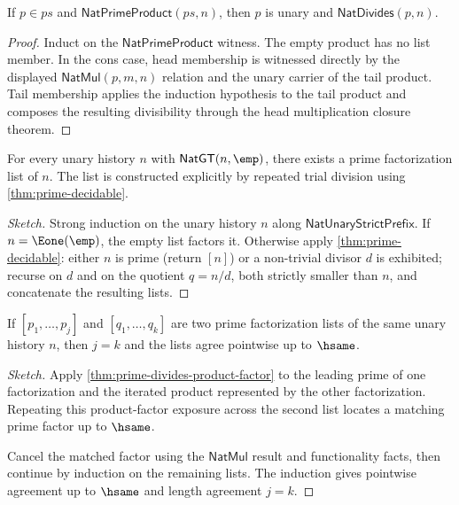 \begin{theorem}
\label{thm:nat-prime-product-factor-mem-unary-divides-result}
If \(p\in ps\) and \(\mathsf{NatPrimeProduct}(ps,n)\), then \(p\) is unary
and \(\mathsf{NatDivides}(p,n)\).
\end{theorem}
\begin{proof}
Induct on the \(\mathsf{NatPrimeProduct}\) witness. The empty product has no
list member. In the cons case, head membership is witnessed directly by the
displayed \(\mathsf{NatMul}(p,m,n)\) relation and the unary carrier of the
tail product. Tail membership applies the induction hypothesis to the tail
product and composes the resulting divisibility through the head
multiplication closure theorem.
\end{proof}

\begin{theorem}
\label{thm:ftoa-existence}
For every unary history \(n\) with \(\mathsf{NatGT}(n, \emp)\), there exists a prime factorization list of \(n\). The list is constructed explicitly by repeated trial division using \autoref{thm:prime-decidable}.
\end{theorem}
\begin{proof}[Sketch]
Strong induction on the unary history \(n\) along \(\mathsf{NatUnaryStrictPrefix}\). If \(n = \Eone(\emp)\), the empty list factors it. Otherwise apply \autoref{thm:prime-decidable}: either \(n\) is prime (return \([n]\)) or a non-trivial divisor \(d\) is exhibited; recurse on \(d\) and on the quotient \(q = n / d\), both strictly smaller than \(n\), and concatenate the resulting lists.
\end{proof}

\begin{theorem}
\label{thm:ftoa-uniqueness}
If \([p_1, \dots, p_j]\) and \([q_1, \dots, q_k]\) are two prime factorization lists of the same unary history \(n\), then \(j = k\) and the lists agree pointwise up to \(\hsame\).
\end{theorem}
\begin{proof}[Sketch]
Apply \autoref{thm:prime-divides-product-factor} to the leading prime of one factorization and the iterated product represented by the other factorization. Repeating this product-factor exposure across the second list locates a matching prime factor up to \(\hsame\).

Cancel the matched factor using the \(\mathsf{NatMul}\) result and functionality facts, then continue by induction on the remaining lists. The induction gives pointwise agreement up to \(\hsame\) and length agreement \(j = k\).
\end{proof}

